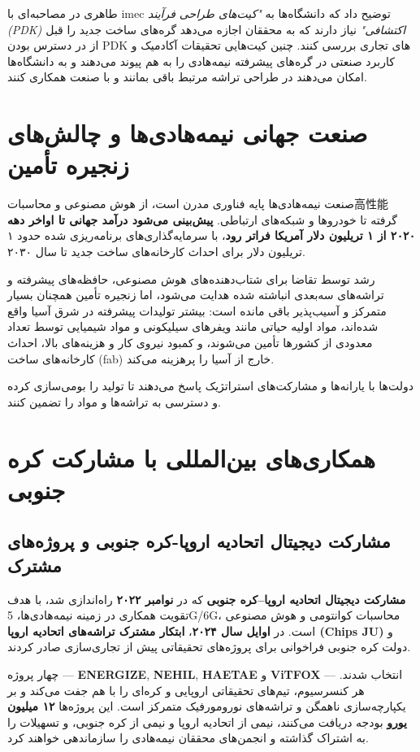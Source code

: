 \documentclass[10pt]{report}
\begin{document}
طاهری در مصاحبه‌ای با imec توضیح داد که دانشگاه‌ها به \textit{"کیت‌های طراحی فرآیند (PDK) اکتشافی"} نیاز دارند که به محققان اجازه می‌دهد گره‌های ساخت جدید را قبل از در دسترس بودن PDK های تجاری بررسی کنند. چنین کیت‌هایی تحقیقات آکادمیک و کاربرد صنعتی در گره‌های پیشرفته نیمه‌هادی را به هم پیوند می‌دهند و به دانشگاه‌ها امکان می‌دهند در طراحی تراشه مرتبط باقی بمانند و با صنعت همکاری کنند.

\section{صنعت جهانی نیمه‌هادی‌ها و چالش‌های زنجیره تأمین}

صنعت نیمه‌هادی‌ها پایه فناوری مدرن است، از هوش مصنوعی و محاسبات高性能 گرفته تا خودروها و شبکه‌های ارتباطی. \textbf{پیش‌بینی می‌شود درآمد جهانی تا اواخر دهه ۲۰۲۰ از ۱ تریلیون دلار آمریکا فراتر رود}، با سرمایه‌گذاری‌های برنامه‌ریزی شده حدود ۱ تریلیون دلار برای احداث کارخانه‌های ساخت جدید تا سال ۲۰۳۰.

رشد توسط تقاضا برای شتاب‌دهنده‌های هوش مصنوعی، حافظه‌های پیشرفته و تراشه‌های سه‌بعدی انباشته شده هدایت می‌شود، اما زنجیره تأمین همچنان بسیار متمرکز و آسیب‌پذیر باقی مانده است: بیشتر تولیدات پیشرفته در شرق آسیا واقع شده‌اند، مواد اولیه حیاتی مانند ویفرهای سیلیکونی و مواد شیمیایی توسط تعداد معدودی از کشورها تأمین می‌شوند، و کمبود نیروی کار و هزینه‌های بالا، احداث کارخانه‌های ساخت (fab) خارج از آسیا را پرهزینه می‌کند.

دولت‌ها با یارانه‌ها و مشارکت‌های استراتژیک پاسخ می‌دهند تا تولید را بومی‌سازی کرده و دسترسی به تراشه‌ها و مواد را تضمین کنند.

\section{همکاری‌های بین‌المللی با مشارکت کره جنوبی}

\subsection{مشارکت دیجیتال اتحادیه اروپا-کره جنوبی و پروژه‌های مشترک}

\textbf{مشارکت دیجیتال اتحادیه اروپا–کره جنوبی} که در \textbf{نوامبر ۲۰۲۲} راه‌اندازی شد، با هدف تقویت همکاری در زمینه نیمه‌هادی‌ها، 5G/6G، محاسبات کوانتومی و هوش مصنوعی است. در \textbf{اوایل سال ۲۰۲۴}، \textbf{ابتکار مشترک تراشه‌های اتحادیه اروپا (Chips JU)} و دولت کره جنوبی فراخوانی برای پروژه‌های تحقیقاتی پیش از تجاری‌سازی صادر کردند.

چهار پروژه — \textbf{ENERGIZE}, \textbf{NEHIL}, \textbf{HAETAE} و \textbf{ViTFOX} — انتخاب شدند. هر کنسرسیوم، تیم‌های تحقیقاتی اروپایی و کره‌ای را با هم جفت می‌کند و بر یکپارچه‌سازی ناهمگن و تراشه‌های نورومورفیک متمرکز است. این پروژه‌ها \textbf{۱۲ میلیون یورو} بودجه دریافت می‌کنند، نیمی از اتحادیه اروپا و نیمی از کره جنوبی، و تسهیلات را به اشتراک گذاشته و انجمن‌های محققان نیمه‌هادی را سازماندهی خواهند کرد.
\end{document}

